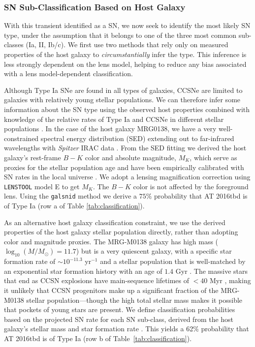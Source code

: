 \documentclass[12pt]{article}
\def\SNABC{AT 2016tbd\xspace}
\def\lenstool{{\tt LENSTOOL}\xspace}
\begin{document}
\subsubsection*{SN Sub-Classification Based on Host Galaxy}
With this transient identified as a SN, we now seek to identify the most likely SN type, under the assumption that it belongs to one of the three most common sub-classes (Ia, II, Ib/c).   We first use two methods that rely only on measured properties of the host galaxy to {\it circumstantially} infer the type. This inference is less strongly dependent on the lens model, helping to reduce any bias associated with a lens model-dependent classification. 

Although Type Ia SNe are found in all types of galaxies, CCSNe are limited to galaxies with relatively young stellar populations.  We can therefore infer some information about the SN type using the observed host properties combined with knowledge of the relative rates of Type Ia and CCSNe in different stellar populations \cite{mannucci_supernova_2005}.  In the case of the host galaxy MRG0138, we have a very well-constrained spectral energy distribution (SED) extending out to far-infrared wavelengths with \textit{Spitzer} IRAC data \cite{newman_resolving_2018,newman_resolving_2018-1}.  
From the SED fitting we derived the host galaxy's 
rest-frame $B-K$ color and absolute magnitude, $M_K$, which serve as proxies for the stellar population age and have been empirically calibrated with SN rates in the local universe \cite{foley_classifying_2013}.  We  adopt a lensing magnification correction using \lenstool model E to get $M_K$. 
The $B-K$ color is not affected by the foreground lens.
Using the {\tt galsnid} method \cite{foley_classifying_2013} we 
derive a $75\%$ probability that \SNABC is of Type Ia (row a of Table \ref{tab:classification}).

As an alternative host galaxy classification constraint, we use the derived properties of the host galaxy stellar population directly,  rather than adopting color and magnitude proxies. The MRG-M0138 galaxy has high mass ($\log_{10}(M/M_{\odot})=11.7$) but is a very quiescent galaxy, with a specific star formation rate of $\sim10^{-11.3}$ yr$^{-1}$  and a stellar population that is well-matched by an exponential star formation history with an age of $1.4$ Gyr \cite{newman_resolving_2018}. 
The massive stars that end as CCSN explosions have main-sequence lifetimes of $<40$ Myr \cite{smartt_progenitors_2009},  making it unlikely that CCSN progenitors make up a significant fraction of the MRG-M0138 stellar population---though the high total stellar mass makes it possible that pockets of young stars are present.  We define classification probabilities based on the projected SN rate for each SN sub-class, derived from the host galaxy's stellar mass and star formation rate \cite{li_rates_2012}.  This yields a 62\% probability that \SNABC is of Type Ia (row b of Table~\ref{tab:classification}).
\end{document}
